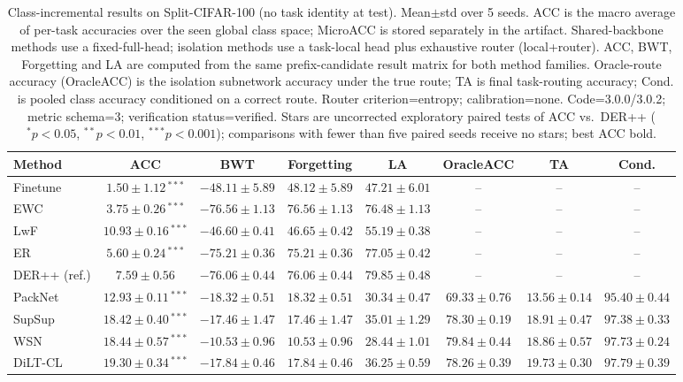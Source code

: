 \begin{table}[t]
\centering
\caption{Class-incremental results on Split-CIFAR-100 (no task identity at test). Mean$\pm$std over 5 seeds. ACC is the macro average of per-task accuracies over the seen global class space; MicroACC is stored separately in the artifact. Shared-backbone methods use a fixed-full-head; isolation methods use a task-local head plus exhaustive router (local+router). ACC, BWT, Forgetting and LA are computed from the same prefix-candidate result matrix for both method families. Oracle-route accuracy (OracleACC) is the isolation subnetwork accuracy under the true route; TA is final task-routing accuracy; Cond. is pooled class accuracy conditioned on a correct route. Router criterion=entropy; calibration=none. Code=3.0.0/3.0.2; metric schema=3; verification status=verified. Stars are uncorrected exploratory paired tests of ACC vs.\ DER++ ($^{*}p<0.05$, $^{**}p<0.01$, $^{***}p<0.001$); comparisons with fewer than five paired seeds receive no stars; best ACC bold.}
\label{tab:classil_cifar}
\begin{tabular}{lccccccc}
\toprule
Method & ACC & BWT & Forgetting & LA & OracleACC & TA & Cond. \\
\midrule
Finetune & $1.50\pm1.12$\,$^{***}$ & $-48.11\pm5.89$ & $48.12\pm5.89$ & $47.21\pm6.01$ & -- & -- & -- \\
EWC & $3.75\pm0.26$\,$^{***}$ & $-76.56\pm1.13$ & $76.56\pm1.13$ & $76.48\pm1.13$ & -- & -- & -- \\
LwF & $10.93\pm0.16$\,$^{***}$ & $-46.60\pm0.41$ & $46.65\pm0.42$ & $55.19\pm0.38$ & -- & -- & -- \\
ER & $5.60\pm0.24$\,$^{***}$ & $-75.21\pm0.36$ & $75.21\pm0.36$ & $77.05\pm0.42$ & -- & -- & -- \\
DER++ (ref.) & $7.59\pm0.56$ & $-76.06\pm0.44$ & $76.06\pm0.44$ & $79.85\pm0.48$ & -- & -- & -- \\
PackNet & $12.93\pm0.11$\,$^{***}$ & $-18.32\pm0.51$ & $18.32\pm0.51$ & $30.34\pm0.47$ & $69.33\pm0.76$ & $13.56\pm0.14$ & $95.40\pm0.44$ \\
SupSup & $18.42\pm0.40$\,$^{***}$ & $-17.46\pm1.47$ & $17.46\pm1.47$ & $35.01\pm1.29$ & $78.30\pm0.19$ & $18.91\pm0.47$ & $97.38\pm0.33$ \\
WSN & $18.44\pm0.57$\,$^{***}$ & $-10.53\pm0.96$ & $10.53\pm0.96$ & $28.44\pm1.01$ & $79.84\pm0.44$ & $18.86\pm0.57$ & $97.73\pm0.24$ \\
DiLT-CL & $\mathbf{19.30\pm0.34}$\,$^{***}$ & $-17.84\pm0.46$ & $17.84\pm0.46$ & $36.25\pm0.59$ & $78.26\pm0.39$ & $19.73\pm0.30$ & $97.79\pm0.39$ \\
\bottomrule
\end{tabular}
\end{table}

